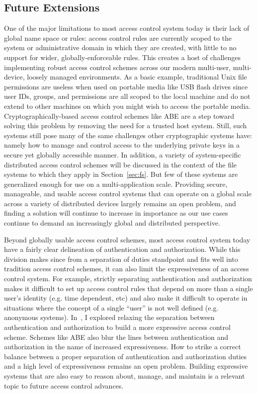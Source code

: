 \documentclass{sig-alternate}
\begin{document}
\subsection{Future Extensions}

One of the major limitations to most access control system today is
their lack of global name space or rules: access control rules are
currently scoped to the system or administrative domain in which they
are created, with little to no support for wider, globally-enforceable
rules. This creates a host of challenges implementing robust access
control schemes across our modern multi-user, multi-device, loosely
managed environments. As a basic example, traditional Unix file
permissions are useless when used on portable media like USB flash
drives since user IDs, groups, and permissions are all scoped to the
local machine and do not extend to other machines on which you might
wish to access the portable media. Cryptographically-based access
control schemes like ABE are a step toward solving this problem by
removing the need for a trusted host system. Still, such systems still
pose many of the same challenges other cryptographic systems have:
namely how to manage and control access to the underlying private keys
in a secure yet globally accessible manner. In addition, a variety of
system-specific distributed access control schemes will be discussed
in the context of the file systems to which they apply in
Section~\ref{sec:fs}. But few of these systems are generalized enough
for use on a multi-application scale. Providing secure, manageable,
and usable access control systems that can operate on a global scale
across a variety of distributed devices largely remains an open
problem, and finding a solution will continue to increase in
importance as our use cases continue to demand an increasingly global
and distributed perspective.

Beyond globally usable access control schemes, most access control
system today have a fairly clear delineation of authentication and
authorization. While this division makes since from a separation of
duties standpoint and fits well into tradition access control schemes,
it can also limit the expressiveness of an access control system. For
example, strictly separating authentication and authorization makes it
difficult to set up access control rules that depend on more than a
single user's identity (e.g. time dependent, etc) and also make it
difficult to operate in situations where the concept of a single
``user'' is not well defined (e.g. anonymous systems).
In~\cite{custos-masters}, I explored relaxing the separation between
authentication and authorization to build a more expressive access
control scheme. Schemes like ABE also blur the lines between
authentication and authorization in the name of increased
expressiveness. How to strike a correct balance between a proper
separation of authentication and authorization duties and a high level
of expressiveness remains an open problem. Building expressive systems
that are also easy to reason about, manage, and maintain is a relevant
topic to future access control advances.
\end{document}
